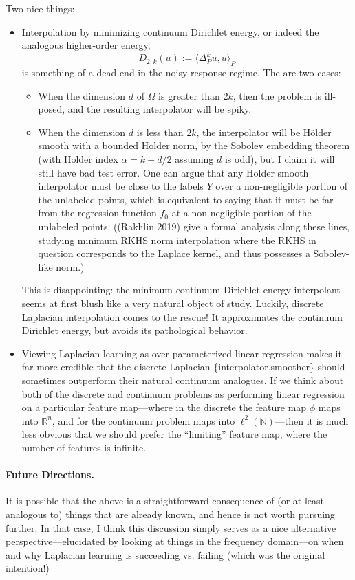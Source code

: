 \documentclass{article}
\newcommand{\Reals}{\mathbb{R}}
\newcommand{\1}{\mathbf{1}}
\newcommand{\dotp}[2]{\langle #1, #2 \rangle}
\theoremstyle{definition}
\theoremstyle{remark}
\begin{document}
Two nice things: 
\begin{itemize}
	\item Interpolation by minimizing continuum Dirichlet energy, or indeed the analogous higher-order energy,
	\begin{equation*}
	D_{2,k}(u) := \dotp{\Delta_P^ku}{u}_{P}
	\end{equation*}
	is something of a dead end in the noisy response regime.  The are two cases:
	\begin{itemize}
		\item When the dimension $d$ of $\Omega$ is greater than $2k$, then the problem is ill-posed, and the resulting interpolator will be spiky.
		\item When the dimension $d$ is less than $2k$, the interpolator will be H\"{o}lder smooth with a bounded Holder norm, by the Sobolev embedding theorem (with Holder index $\alpha = k - d/2$ assuming $d$ is odd), but I claim it will still have bad test error. One can argue that any Holder smooth interpolator must be close to the labels $Y$ over a non-negligible portion of the unlabeled points, which is equivalent to saying that it must be far from the regression function $f_0$ at a non-negligible portion of the unlabeled points. ((Rakhlin 2019) give a formal analysis along these lines, studying minimum RKHS norm interpolation where the RKHS in question corresponds to the Laplace kernel, and thus possesses a Sobolev-like norm.)
	\end{itemize}
	This is disappointing: the minimum continuum Dirichlet energy interpolant seems at first blush like a very natural object of study. Luckily, discrete Laplacian interpolation comes to the rescue! It approximates the continuum Dirichlet energy, but avoids its pathological behavior. 
	\item Viewing Laplacian learning as over-parameterized linear regression makes it far more credible that the discrete Laplacian \{interpolator,smoother\} should sometimes outperform their natural continuum analogues. If we think about both of the discrete and continuum problems as performing linear regression on a particular feature map---where in the discrete the feature map $\phi$ maps into $\Reals^n$, and for the continuum problem maps into $\ell^2(\mathbb{N})$---then it is much less obvious that we should prefer the ``limiting'' feature map, where the number of features is infinite. 
\end{itemize}


\paragraph{Future Directions.}
It is possible that the above is a straightforward consequence of (or at least analogous to) things that are already known, and hence is not worth pursuing further. In that case, I think this discussion simply serves as a nice alternative perspective---elucidated by looking at things in the frequency domain---on when and why Laplacian learning is succeeding vs. failing (which was the original intention!)
\end{document}
